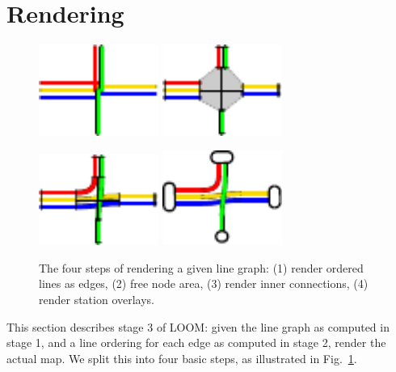 \documentclass[format=acmsmall, review=false, screen=true]{acmart}
\begin{document}
\section{Rendering}\label{SEC:rendering}
%
\begin{figure}[b]
  \centering
  \includegraphics[width=0.35\textwidth]{render_examples/rendering/render_example1.pdf}
  \hspace{1cm}
  \includegraphics[width=0.35\textwidth]{render_examples/rendering/render_example2.pdf}

  \vspace{0.8cm}
  \centering
  \includegraphics[width=0.35\textwidth]{render_examples/rendering/render_example3.pdf}
  \hspace{1cm}
  \includegraphics[width=0.35\textwidth]{render_examples/rendering/render_example4.pdf}

	\caption{The four steps of rendering a given line graph: (1) render ordered lines as edges, (2) free node area, (3) render inner connections, (4) render station overlays.}
	\label{FIG:renderingproc}
\end{figure}
This section describes stage 3 of LOOM: given the line graph as computed in stage 1, and a line ordering for each edge as computed in stage 2, render the actual map.
We split this into four basic steps, as illustrated in Fig.~\ref{FIG:renderingproc}.
\end{document}
